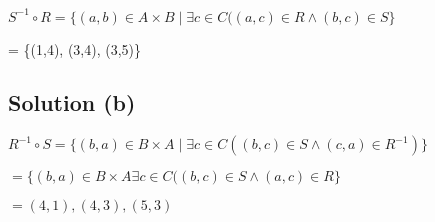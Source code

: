 \documentclass{article}
\begin{document}
$S^{-1} \circ R = \{(a,b) \in A \times B \mid \exists c \in C((a,c)
\in R \land (b,c) \in S\}$

= \{(1,4), (3,4), (3,5)\}

\subsection{Solution (b)}
\noindent
$R^{-1} \circ S = \{(b,a) \in B \times A \mid \exists c \in C((b,c)
\in S \land (c,a) \in R^{-1})\}$

$= \{(b,a) \in B \times A \exists c \in C((b,c) \in S \land (a,c) \in R\}$

$={(4,1),(4,3),(5,3)}$
\end{document}

